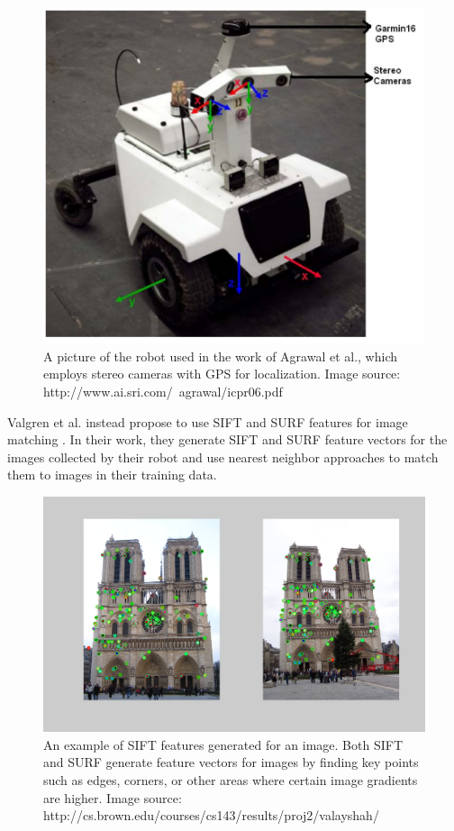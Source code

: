 \documentclass[letterpaper, 12 pt, conference]{ieeeconf}  %
\begin{document}
\begin{figure}[h]
\centering
\includegraphics[scale=0.75]{Stereo}
\caption{A picture of the robot used in the work of Agrawal et al., which employs stereo cameras with GPS for localization. Image source: http://www.ai.sri.com/~agrawal/icpr06.pdf}
\end{figure}
\par
Valgren et al. instead propose to use SIFT and SURF features for image matching \cite{valgren2007sift}. In their work, they generate SIFT \cite{sift} and SURF\cite{surf} feature vectors for the images collected by their robot and use nearest neighbor approaches to match them to images in their training data. 

\begin{figure}[h]
\centering
\includegraphics[scale=0.15]{sift}
\caption{An example of SIFT features generated for an image. Both SIFT and SURF generate feature vectors for images by finding key points such as edges, corners, or other areas where certain image gradients are higher. Image source: http://cs.brown.edu/courses/cs143/results/proj2/valayshah/}
\end{figure}
\end{document}
